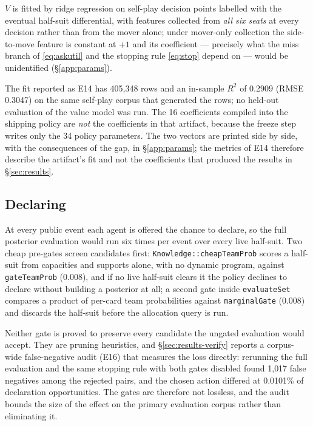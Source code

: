 \documentclass[11pt]{article}
\theoremstyle{definition}
\newcommand{\numValueRows}{405{,}348}
\newcommand{\numValueRSq}{0.2909}
\newcommand{\numValueRmse}{0.3047}
\newcommand{\numGateFalseNeg}{1{,}017}
\newcommand{\numGateActionsPct}{0.0101}
\newcommand{\numParams}{34}
\newcommand{\numValueFeats}{16}
\begin{document}
$V$ is fitted by ridge regression on self-play decision points labelled with
the eventual half-suit differential, with features collected from \emph{all
six seats} at every decision rather than from the mover alone; under
mover-only collection the side-to-move feature is constant at $+1$ and its
coefficient --- precisely what the miss branch of \eqref{eq:askutil} and the
stopping rule \eqref{eq:stop} depend on --- would be unidentified
(\S\ref{app:params}).

The fit reported as E14 has \numValueRows{} rows and an in-sample $R^2$ of
\numValueRSq{} (RMSE \numValueRmse{}) on the same self-play corpus that
generated the rows; no held-out evaluation of the value model was run. The
\numValueFeats{} coefficients compiled into the shipping policy are \emph{not}
the coefficients in that artifact, because the freeze step writes only the
\numParams{} policy parameters. The two vectors are printed side by side, with
the consequences of the gap, in \S\ref{app:params}; the metrics of E14
therefore describe the artifact's fit and not the coefficients that produced
the results in \S\ref{sec:results}.

\subsection{Declaring}
\label{sec:declare}

At every public event each agent is offered the chance to declare, so the full
posterior evaluation would run six times per event over every live half-suit.
Two cheap pre-gates screen candidates first: \texttt{Knowledge::cheapTeamProb}
scores a half-suit from capacities and supports alone, with no dynamic
program, against \texttt{gateTeamProb} ($0.008$), and if no live half-suit
clears it the policy declines to declare without building a posterior at all;
a second gate inside \texttt{evaluateSet} compares a product of per-card team
probabilities against \texttt{marginalGate} ($0.008$) and discards the
half-suit before the allocation query is run.

Neither gate is proved to preserve every candidate the ungated evaluation would
accept. They are pruning heuristics, and \S\ref{sec:results-verify} reports a
corpus-wide false-negative audit (E16) that measures the loss directly: rerunning
the full evaluation and the same stopping rule with both gates disabled found
\numGateFalseNeg{} false negatives among the rejected pairs, and the chosen
action differed at \numGateActionsPct\% of declaration opportunities. The gates
are therefore not lossless, and the audit bounds the size of the effect on the
primary evaluation corpus rather than eliminating it.
\end{document}
